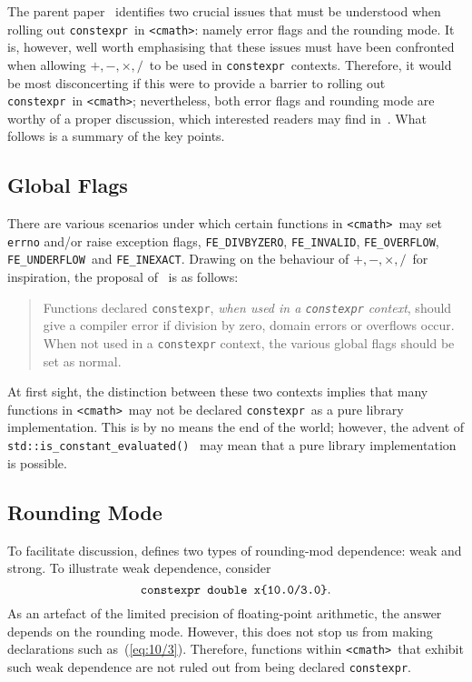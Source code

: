 \documentclass[prd,twocolumn,amsmath,amssymb,nofootinbib,eqsecnum]{revtex4-1}
\newcommand{\constexpr}{\code{constexpr}\xspace}
\newcommand{\code}[1]{{\tt #1}}
\newcommand{\header}[1]{{\tt <#1>}}
\newcommand{\cmath}{\header{cmath}}
\newcommand{\FEINVALID}{{\tt FE\_INVALID}}
\newcommand{\FEDIVBYZERO}{{\tt FE\_DIVBYZERO}}
\newcommand{\FEINEXACT}{{\tt FE\_INEXACT}}
\newcommand{\FEUNDERFLOW}{{\tt FE\_UNDERFLOW}}
\newcommand{\FEOVERFLOW}{{\tt FE\_OVERFLOW}}
\newcommand{\Operators}{\ensuremath{+,-,\times,/}}
\newcommand{\eq}[1]{(\ref{eq:#1})}
\begin{document}
The parent paper~\cite{Rosten-constexpr} identifies two crucial issues that must be understood when rolling out \constexpr\ in \cmath: namely error flags and the rounding mode. It is, however, well worth emphasising that these issues must have been confronted when allowing \Operators\ to be used in \constexpr\ contexts. Therefore, it would be most disconcerting if this were to provide a barrier to rolling out \constexpr\ in \cmath; nevertheless, both error flags and rounding mode are worthy of a proper discussion, which interested readers may find in~\cite{Rosten-constexpr}. What follows is a summary of the key points.

\subsection{Global Flags}

There are various scenarios under which certain functions in \cmath\ may set \code{errno} and/or raise exception flags, \FEDIVBYZERO, \FEINVALID, \FEOVERFLOW, \FEUNDERFLOW\ and
\FEINEXACT. Drawing on the behaviour of \Operators\ for inspiration, the proposal of~\cite{Rosten-constexpr} is as follows:
\begin{quotation}
	Functions declared \constexpr, \emph{when used in a \constexpr
context}, should give a compiler error if division by zero, domain errors or
overflows occur. When not used in a \constexpr context, the various global
flags should be set as normal.
\end{quotation}
At first sight, the distinction between these two contexts implies that many functions in \cmath\ may not be declared \constexpr\ as a pure library implementation. This is by no means the end of the world; however, the advent of \code{std::is\_constant\_evaluated()}~\cite{ConstEval}
may mean that a pure library implementation is possible.

\subsection{Rounding Mode}
\label{sec:rounding}

To facilitate discussion, \cite{Rosten-constexpr} defines two types of rounding-mod dependence: weak and strong. To illustrate weak dependence, consider
\begin{equation}
	\mbox{\code{constexpr double x\{10.0/3.0\}}}.
\label{eq:10/3}
\end{equation}
As an artefact of the limited precision of floating-point arithmetic, the answer depends on the rounding mode. However, this does not stop us from making declarations such as~\eq{10/3}. Therefore, functions  within \cmath\ that exhibit such weak dependence are not ruled out from being declared \constexpr.
\end{document}
